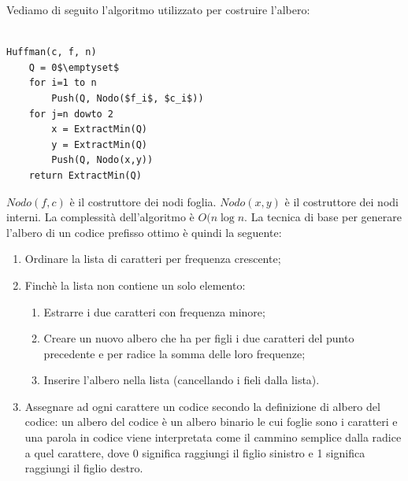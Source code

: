 Vediamo di seguito l'algoritmo utilizzato per costruire l'albero:

\begin{lstlisting}[mathescape=true, caption=Huffman]

Huffman(c, f, n)
	Q = 0$\emptyset$
	for i=1 to n
		Push(Q, Nodo($f_i$, $c_i$))
	for j=n dowto 2
		x = ExtractMin(Q)
		y = ExtractMin(Q)
		Push(Q, Nodo(x,y))
	return ExtractMin(Q)

\end{lstlisting}

$Nodo(f,c)$ è il costruttore dei nodi foglia. $Nodo(x,y)$ è il costruttore dei nodi interni. La complessità dell'algoritmo è \textbf{$O(n\log n$}.
\linebreak
\linebreak
La tecnica di base per generare l'albero di un codice prefisso ottimo è quindi la seguente:

\begin{enumerate}

\item Ordinare la lista di caratteri per frequenza crescente;
\item Finchè la lista non contiene un solo elemento:
	\begin{enumerate}

	\item Estrarre i due caratteri con frequenza minore;
	\item Creare un nuovo albero che ha per figli i due caratteri del punto precedente e per radice la somma delle loro frequenze;
	\item Inserire l'albero nella lista (cancellando i fieli dalla lista).

	\end{enumerate}
\item Assegnare ad ogni carattere un codice secondo la definizione di albero del codice: un albero del codice è un albero binario le cui foglie sono i caratteri e una parola in codice viene interpretata come il cammino semplice dalla radice a quel carattere, dove 0 significa raggiungi il figlio sinistro e 1 significa raggiungi il figlio destro.
\end{enumerate}
